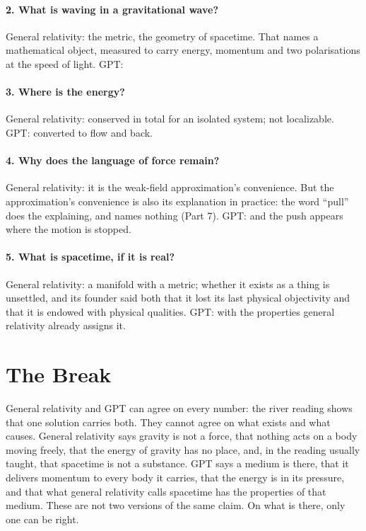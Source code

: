 \paragraph{2. What is waving in a gravitational wave?} General relativity: the metric, the geometry of spacetime. That names a mathematical object, measured to carry energy, momentum and two polarisations at the speed of light. GPT: 

\paragraph{3. Where is the energy?} General relativity: conserved in total for an isolated system; not localizable. GPT:  converted to flow and back.

\paragraph{4. Why does the language of force remain?} General relativity: it is the weak-field approximation's convenience. But the approximation's convenience is also its explanation in practice: the word ``pull'' does the explaining, and names nothing (Part 7). GPT:  and the push appears where the motion is stopped.

\paragraph{5. What is spacetime, if it is real?} General relativity: a manifold with a metric; whether it exists as a thing is unsettled, and its founder said both that it lost its last physical objectivity and that it is endowed with physical qualities. GPT:  with the properties general relativity already assigns it.

\section{The Break}

 General relativity and GPT can agree on every number: the river reading shows that one solution carries both. They cannot agree on what exists and what causes. General relativity says gravity is not a force, that nothing acts on a body moving freely, that the energy of gravity has no place, and, in the reading usually taught, that spacetime is not a substance. GPT says a medium is there, that it delivers momentum to every body it carries, that the energy is in its pressure, and that what general relativity calls spacetime has the properties of that medium. These are not two versions of the same claim. On what is there, only one can be right.

